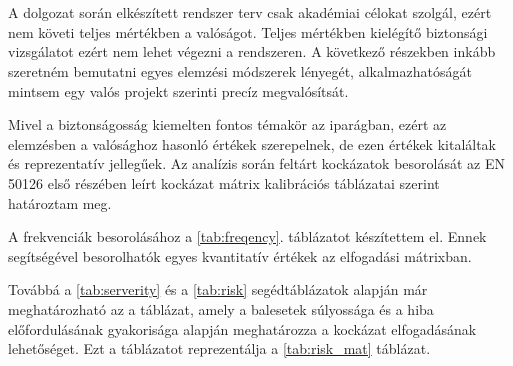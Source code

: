 \chapter{\analysis}\label{chap:analysis}
A dolgozat során elkészített rendszer terv csak akadémiai célokat szolgál, ezért nem követi teljes mértékben a valóságot.
Teljes mértékben kielégítő biztonsági vizsgálatot ezért nem lehet végezni a rendszeren.
A következő részekben inkább szeretném bemutatni egyes elemzési módszerek lényegét, alkalmazhatóságát mintsem egy valós projekt szerinti precíz megvalósítsát.

Mivel a biztonságosság kiemelten fontos témakör az iparágban, ezért az elemzésben a valósághoz hasonló értékek szerepelnek, de ezen értékek kitaláltak és reprezentatív jellegűek.
Az analízis során feltárt kockázatok besorolását az EN 50126\cite{EN50126-1} első részében leírt kockázat mátrix kalibrációs táblázatai szerint határoztam meg.

A frekvenciák besorolásához a \ref{tab:freqency}. táblázatot készítettem el.
Ennek segítségével besorolhatók egyes kvantitatív értékek az elfogadási mátrixban.

Továbbá a \ref{tab:serverity} és a \ref{tab:risk} segédtáblázatok alapján már meghatározható az a táblázat, amely a balesetek súlyossága és a hiba előfordulásának gyakorisága alapján meghatározza a kockázat elfogadásának lehetőséget.
Ezt a táblázatot reprezentálja a \ref{tab:risk_mat} táblázat.

